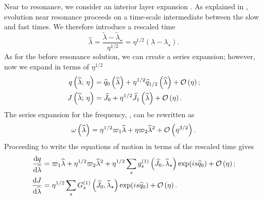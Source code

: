 Near to resonance, we consider an interior layer expansion \citep{Kevorkian1971}. As explained in , evolution near resonance proceeds on a time-scale intermediate between the slow and fast times. We therefore introduce a rescaled time
\begin{equation}
\widehat{\lambda} = \dfrac{\widetilde{\lambda} - \widetilde{\lambda}_\star}{\eta^{1/2}} = \eta^{1/2}(\lambda - \lambda_\star).
\end{equation}
As for the before resonance solution, we can create a series expansion; however, now we expand in terms of $\eta^{1/2}$ \citep{Flanagan2012}
\begin{subequations}
\begin{align}
q\left(\widehat{\lambda};\,\eta\right) = {} & \widehat{q}_0\left(\widehat{\lambda}\right) + \eta^{1/2} \widehat{q}_{1/2}\left(\widehat{\lambda}\right) + \mathcal{O}\left({\eta}\right); \\
J\left(\widehat{\lambda};\,\eta\right) = {} & \widehat{J}_0 + \eta^{1/2} \widehat{J}_1\left(\widehat{\lambda}\right) + \mathcal{O}\left({\eta}\right).
\end{align}
\end{subequations}
The series expansion for the frequency, , can be rewritten as
\begin{equation}
\omega\left(\widehat{\lambda}\right) = \eta^{1/2}\varpi_1\widehat{\lambda} + \eta\varpi_2\widehat{\lambda}^2 + \mathcal{O}\left({\eta^{3/2}}\right).
\label{eq:omega-hat}
\end{equation}
Proceeding to write the equations of motion in terms of the rescaled time gives
\begin{subequations}
\begin{align}
\dfrac{\mathrm{d} {q}}{\mathrm{d} {\widehat{\lambda}}} = {} & \varpi_1\widehat{\lambda} + \eta^{1/2}\varpi_2\widehat{\lambda}^2 + \eta^{1/2}\sum_s g_s^{(1)}\left(\widehat{J}_0,\widetilde{\lambda}_\star\right)\exp(is \widehat{q}_0)  + \mathcal{O}\left({\eta}\right); \\
\dfrac{\mathrm{d} {J}}{\mathrm{d} {\widehat{\lambda}}} = {} & \eta^{1/2}\sum_s G_s^{(1)}\left(\widehat{J}_0,\widetilde{\lambda}_\star\right)\exp(is \widehat{q}_0) + \mathcal{O}\left({\eta}\right).
\end{align}
\end{subequations}

